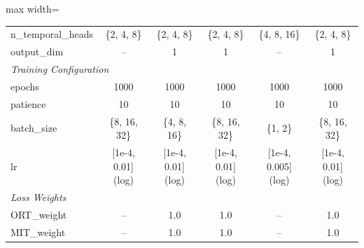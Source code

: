\begin{table}[H]
\begin{adjustbox}{max width=\textwidth}
\begin{small}
\begin{tabular}{l|ccccc}
n\_temporal\_heads & \{2, 4, 8\} & \{2, 4, 8\} & \{2, 4, 8\} & \{4, 8, 16\} & \{2, 4, 8\} \\
output\_dim & -- & 1 & 1 & -- & 1 \\
\midrule
\multicolumn{6}{l}{\textit{Training Configuration}} \\
epochs & 1000 & 1000 & 1000 & 1000 & 1000 \\
patience & 10 & 10 & 10 & 10 & 10 \\
batch\_size & \{8, 16, 32\} & \{4, 8, 16\} & \{8, 16, 32\} & \{1, 2\} & \{8, 16, 32\} \\
lr & [1e-4, 0.01] (log) & [1e-4, 0.01] (log) & [1e-4, 0.01] (log) & [1e-4, 0.005] (log) & [1e-4, 0.01] (log) \\
\midrule
\multicolumn{6}{l}{\textit{Loss Weights}} \\
ORT\_weight & -- & 1.0 & 1.0 & -- & 1.0 \\
MIT\_weight & -- & 1.0 & 1.0 & -- & 1.0 \\
\bottomrule
\end{tabular}
\end{small}
\end{adjustbox}
\end{table}


